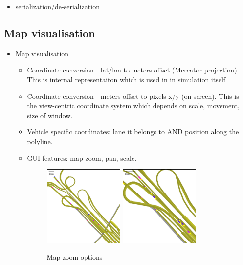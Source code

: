 \begin{itemize}
	\item serialization/de-serialization
\end{itemize}


\subsection{Map visualisation}
\begin{itemize}
    \item Map visualisation
    \begin{itemize}
        \item Coordinate conversion - lat/lon to meters-offset (Mercator projection). This is internal representaiton which is used in in simulation itself
        \item Coordinate conversion - meters-offset to pixels x/y (on-screen). This is the view-centric coordinate system which depends on scale, movement, size of window.
        \item Vehicle specific coordinates: lane it belongs to AND position along the polyline.
        \item GUI features: map zoom, pan, scale.
            \begin{figure}[h]
                \vspace{1.5em}
                \caption{Map zoom options}
                \label{fig:mapZoomOptions}
                \centering
                \includegraphics[width=0.4\textwidth]{figs/road/zoom_dots.png}
                \hspace{0.2em}
                \includegraphics[width=0.4\textwidth]{figs/road/zoom_cars.png}
            \end{figure}

    \end{itemize}
\end{itemize}

